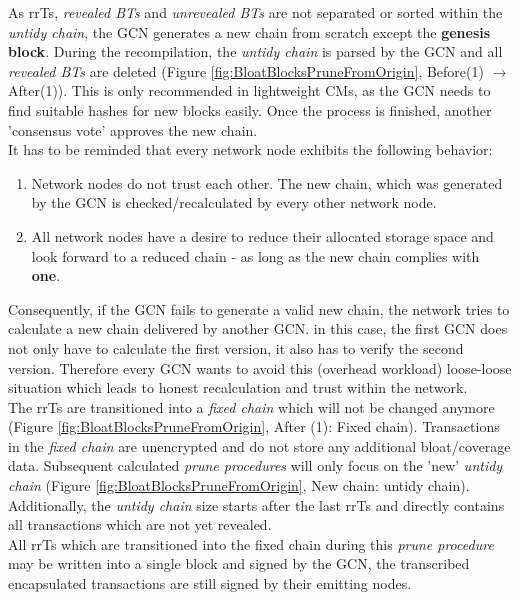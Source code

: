 \noindent As \gls{rrTs}, \textit{revealed \gls{BT}s} and \textit{unrevealed \gls{BT}s}
are not separated or sorted within the \textit{untidy chain}, the \gls{GCN} generates a new chain from scratch except the \textbf{genesis block}.
During the recompilation, the \textit{untidy chain} is parsed by the \gls{GCN} and all \textit{revealed \gls{BT}s}
are deleted (Figure \ref{fig:BloatBlocksPruneFromOrigin}, Before(1) $\to$ After(1)).
This is only recommended in lightweight \gls{CM}s, as the \gls{GCN} needs to find suitable hashes for new blocks easily. 
Once the process is finished, another 'consensus vote' approves the new chain. \\
It has to be reminded that every network node exhibits the following behavior:
\begin{enumerate}
	\item Network nodes do not trust each other.
	The new chain, which was generated by the \gls{GCN} is checked/recalculated by every other network node.
	
	\item All network nodes have a desire to reduce their allocated storage space and look
	forward to a reduced chain - as long as the new chain complies with \textbf{one}.
\end{enumerate}
Consequently, if the \gls{GCN} fails to generate a valid new chain, the network tries to calculate a new chain delivered by another \gls{GCN}.
in this case, the first \gls{GCN} does not only have to calculate the first version, it also has to verify the second version.
Therefore every \gls{GCN} wants to avoid this (overhead workload) loose-loose situation which leads to honest recalculation and trust within the network. \\
The \gls{rrTs} are transitioned into a \textit{fixed chain} which will not be changed anymore (Figure \ref{fig:BloatBlocksPruneFromOrigin}, After (1): Fixed chain).
Transactions in the \textit{fixed chain} are unencrypted and do not store any additional bloat/coverage data.
Subsequent calculated \textit{prune procedures} will only focus on the 'new' \textit{untidy chain} (Figure \ref{fig:BloatBlocksPruneFromOrigin}, New chain: untidy chain).
Additionally, the \textit{untidy chain} size starts after the last \gls{rrTs} and directly contains all transactions which are not yet revealed. \\
All \gls{rrTs} which are transitioned into the fixed chain during this \textit{prune procedure}
may be written into a single block and signed by the \gls{GCN}, the transcribed encapsulated transactions are still signed by their emitting nodes.
